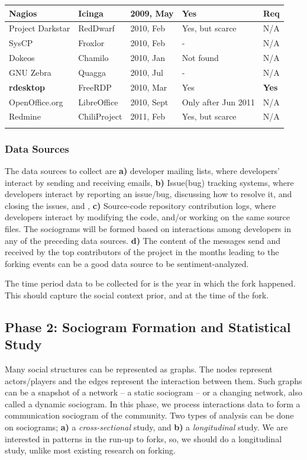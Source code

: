 \documentclass{acm_proc_article-sp}
\begin{document}
\begin{table} [!Ht]
\begin{tabular}{m{} m{} m{} m{} m{}}
Nagios & Icinga & 2009, May & Yes & Req \\ \hline
Project Darkstar& RedDwarf & 2010, Feb & Yes, but scarce & N/A \\ \hline
SysCP & Froxlor & 2010, Feb & - & N/A \\ \hline
Dokeos & Chamilo & 2010, Jan & Not found & N/A \\ \hline
GNU Zebra & Quagga & 2010, Jul & - & N/A \\ \hline
\textbf{rdesktop} & FreeRDP & 2010, Mar & Yes & \textbf{Yes} \\ \hline
OpenOffice.org & LibreOffice & 2010, Sept & Only after Jun 2011 & N/A \\ \hline
Redmine & ChiliProject & 2011, Feb & Yes, but scarce & N/A \\
\noalign{\smallskip}\hline
\end{tabular}
\end{table}

\subsubsection{Data Sources}
The data sources to collect are \textbf{a)} developer mailing lists, where developers' interact by sending and receiving emails, \textbf{b)} Issue(bug) tracking systems, where developers interact by reporting an issue/bug, discussing how to resolve it, and closing the issues, and , \textbf{c)} Source-code repository contribution logs, where developers interact by modifying the code, and/or working on the same source files. The sociograms will be formed based on interactions among developers in any of the preceding data sources. \textbf{d)} The content of the messages send and received by the top contributors of the project in the months leading to the forking events can be a good data source to be sentiment-analyzed. 

The time period data to be collected for is the year in which the fork happened. This should capture the social context prior, and at the time of the fork.

\subsection{Phase 2: Sociogram Formation and Statistical Study}

Many social structures can be represented as graphs. The nodes represent actors/players and the edges represent the interaction between them. Such graphs can be a snapshot of a network -- a static sociogram -- or a changing network, also called a dynamic sociogram. In this phase, we process interactions data to form a communication sociogram of the community. Two types of analysis can be done on sociograms; \textbf{a)} a \textit{cross-sectional} study, and \textbf{b)} a \textit{longitudinal} study. We are interested in patterns in the run-up to forks, so, we should do a longitudinal study, unlike most existing research on forking.
\end{document}
